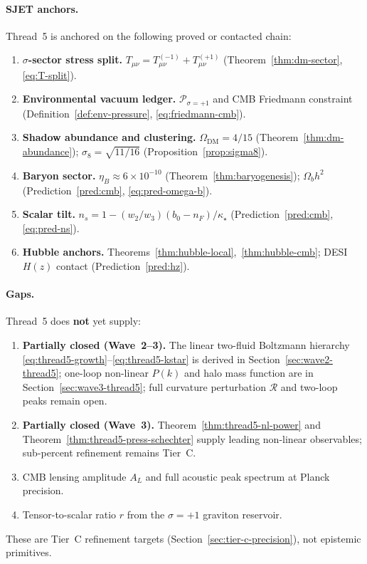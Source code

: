 \paragraph{SJET anchors.}
Thread~5 is anchored on the following proved or contacted chain:
\begin{enumerate}[label=(\roman*),leftmargin=*]
  \item \textbf{$\sigma$-sector stress split.}
    $T_{\mu\nu}=T_{\mu\nu}^{(-1)}+T_{\mu\nu}^{(+1)}$
    (Theorem~\ref{thm:dm-sector}, \eqref{eq:T-split}).
  \item \textbf{Environmental vacuum ledger.}
    $\mathcal{P}_{\sigma=+1}$ and CMB Friedmann constraint
    (Definition~\ref{def:env-pressure}, \eqref{eq:friedmann-cmb}).
  \item \textbf{Shadow abundance and clustering.}
    $\Omega_{\mathrm{DM}}=4/15$ (Theorem~\ref{thm:dm-abundance});
    $\sigma_8=\sqrt{11/16}$ (Proposition~\ref{prop:sigma8}).
  \item \textbf{Baryon sector.}
    $\eta_B\approx 6\times 10^{-10}$ (Theorem~\ref{thm:baryogenesis});
    $\Omega_b h^2$ (Prediction~\ref{pred:cmb}, \eqref{eq:pred-omega-b}).
  \item \textbf{Scalar tilt.}
    $n_s=1-(w_2/w_3)(b_0-n_F)/\kappa_\star$ (Prediction~\ref{pred:cmb},
    \eqref{eq:pred-ns}).
  \item \textbf{Hubble anchors.}
    Theorems~\ref{thm:hubble-local},~\ref{thm:hubble-cmb};
    DESI $H(z)$ contact (Prediction~\ref{pred:hz}).
\end{enumerate}

\paragraph{Gaps.}
Thread~5 does \textbf{not} yet supply:
\begin{enumerate}[label=(\roman*),leftmargin=*]
  \item \textbf{Partially closed (Wave~2--3).}
    The linear two-fluid Boltzmann hierarchy
    \eqref{eq:thread5-growth}--\eqref{eq:thread5-kstar} is derived in
    Section~\ref{sec:wave2-thread5}; one-loop non-linear $P(k)$ and halo mass
    function are in Section~\ref{sec:wave3-thread5}; full curvature
    perturbation $\mathcal{R}$ and two-loop peaks remain open.
  \item \textbf{Partially closed (Wave~3).}
    Theorem~\ref{thm:thread5-nl-power} and
    Theorem~\ref{thm:thread5-press-schechter} supply leading non-linear
    observables; sub-percent refinement remains Tier~C.
  \item CMB lensing amplitude $A_L$ and full acoustic peak spectrum at
    Planck precision.
  \item Tensor-to-scalar ratio $r$ from the $\sigma=+1$ graviton reservoir.
\end{enumerate}
These are Tier~C refinement targets (Section~\ref{sec:tier-c-precision}), not
epistemic primitives.


